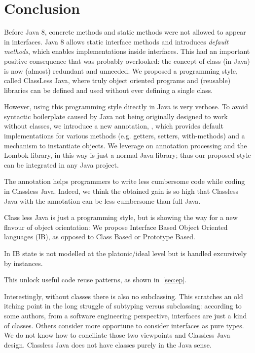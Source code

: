 \section{Conclusion}\label{sec:conclusion}


Before Java 8, concrete methods and static methods were not allowed
to appear in interfaces.  Java 8 allows static interface methods and
introduces \emph{default methods}, which enables implementations
inside interfaces. This had an important positive consequence that
was probably overlooked: the concept of class
(in Java) is now (almost) redundant and unneeded.
We proposed a programming style, called ClassLess Java, where
truly object oriented programs and (reusable) libraries
can be defined and used without ever defining a single class.

However, using this programming style directly in Java is very verbose.
To avoid syntactic boilerplate
caused by Java not being originally designed to work without classes,
we introduce a new annotation, \mixin, which provides default implementations
for various methods (e.g. getters, setters, with-methods) and a
mechanism to instantiate objects. 
We leverage on annotation processing and the Lombok library, in this way
\mixin is just a normal Java library; thus our proposed style can be integrated
in any Java project.

The \mixin annotation helps programmers
to write less cumbersome code while coding in Classless Java. Indeed, 
we think the obtained gain is so high that Classless Java with the \mixin
annotation can be less cumbersome than full Java.


Class less Java is just a programming style, but is 
showing the way for a new flavour of object orientation:
We propose Interface Based Object Oriented languages (IB),
as opposed to Class Based or Prototype Based.

In IB state is not modelled at the platonic/ideal level
but is handled excursively by instances.

This unlock useful code reuse patterns, as shown in~\ref{sec:ep}.



Interestingly, without classes there is also no subclassing. This scratches an old
  itching point in the long struggle of subtyping versus subclassing:
  according to some authors, from a software engineering perspective,
  interfaces are just a kind of classes. Others consider more
  opportune to consider interfaces as pure types. We do not know how to conciliate
  those two viewpoints and Classless Java design.
  Classless Java does not have classes purely in the Java sense.  



